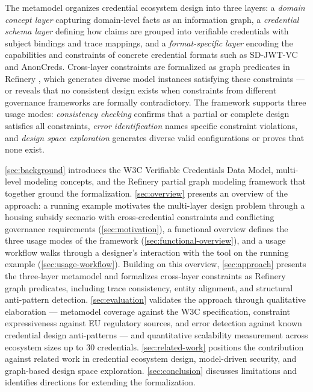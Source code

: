 The metamodel organizes credential ecosystem design into three layers: a \emph{domain concept layer} capturing domain-level facts as an information graph, a \emph{credential schema layer} defining how claims are grouped into verifiable credentials with subject bindings and trace mappings, and a \emph{format-specific layer} encoding the capabilities and constraints of concrete credential formats such as SD-JWT-VC and AnonCreds. Cross-layer constraints are formalized as graph predicates in Refinery \citep{marussy_refinery_2024}, which generates diverse model instances satisfying these constraints --- or reveals that no consistent design exists when constraints from different governance frameworks are formally contradictory. The framework supports three usage modes: \emph{consistency checking} confirms that a partial or complete design satisfies all constraints, \emph{error identification} names specific constraint violations, and \emph{design space exploration} generates diverse valid configurations or proves that none exist.


\autoref{sec:background} introduces the W3C Verifiable Credentials Data Model, multi-level modeling concepts, and the Refinery partial graph modeling framework that together ground the formalization. \autoref{sec:overview} presents an overview of the approach: a running example motivates the multi-layer design problem through a housing subsidy scenario with cross-credential constraints and conflicting governance requirements (\autoref{sec:motivation}), a functional overview defines the three usage modes of the framework (\autoref{sec:functional-overview}), and a usage workflow walks through a designer's interaction with the tool on the running example (\autoref{sec:usage-workflow}). Building on this overview, \autoref{sec:approach} presents the three-layer metamodel and formalizes cross-layer constraints as Refinery graph predicates, including trace consistency, entity alignment, and structural anti-pattern detection. \autoref{sec:evaluation} validates the approach through qualitative elaboration --- metamodel coverage against the W3C specification, constraint expressiveness against EU regulatory sources, and error detection against known credential design anti-patterns --- and quantitative scalability measurement across ecosystem sizes up to 30 credentials. \autoref{sec:related-work} positions the contribution against related work in credential ecosystem design, model-driven security, and graph-based design space exploration. \autoref{sec:conclusion} discusses limitations and identifies directions for extending the formalization.
